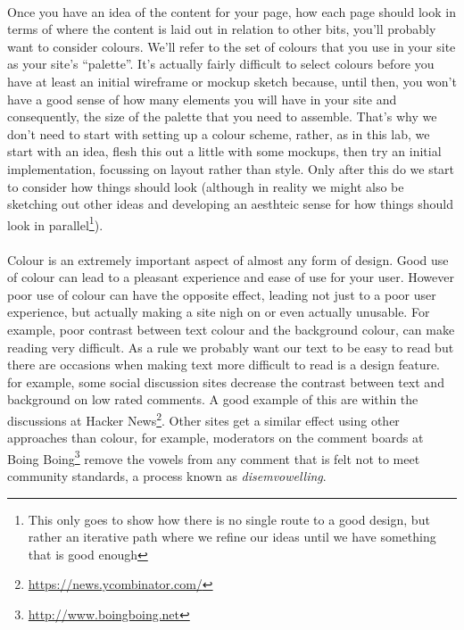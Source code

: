 \documentclass[10pt, a4paper]{article}
\begin{document}
\paragraph{} Once you have an idea of the content for your page, how each page should look in terms of where the content is laid out in relation to other bits, you'll probably want to consider colours. We'll refer to the set of colours that you use in your site as your site's ``palette''. It's actually fairly difficult to select colours before you have at least an initial wireframe or mockup sketch because, until then, you won't have a good sense of how many elements you will have in your site and consequently, the size of the palette that you need to assemble. That's why we don't need to start with setting up a colour scheme, rather, as in this lab, we start with an idea, flesh this out a little with some mockups, then try an initial implementation, focussing on layout rather than style. Only after this do we start to consider how things should look (although in reality we might also be sketching out other ideas and developing an aesthteic sense for how things should look in parallel\footnote{This only goes to show how there is no single route to a good design, but rather an iterative path where we refine our ideas until we have something that is good enough}).

\paragraph{} Colour is an extremely important aspect of almost any form of design. Good use of colour can lead to a pleasant experience and ease of use for your user. However poor use of colour can have the opposite effect, leading not just to a poor user experience, but actually making a site nigh on or even actually unusable. For example, poor contrast between text colour and the background colour, can make reading very difficult. As a rule we probably want our text to be easy to read but there are occasions when making text more difficult to read is a design feature. for example, some social discussion sites decrease the contrast between text and background on low rated comments. A good example of this are within the discussions at Hacker News\footnote{\url{https://news.ycombinator.com/}}. Other sites get a similar effect using other approaches than colour, for example, moderators on the comment boards at Boing Boing\footnote{\url{http://www.boingboing.net}} remove the vowels from any comment that is felt not to meet community standards, a process known as \emph{disemvowelling}.
\end{document}
